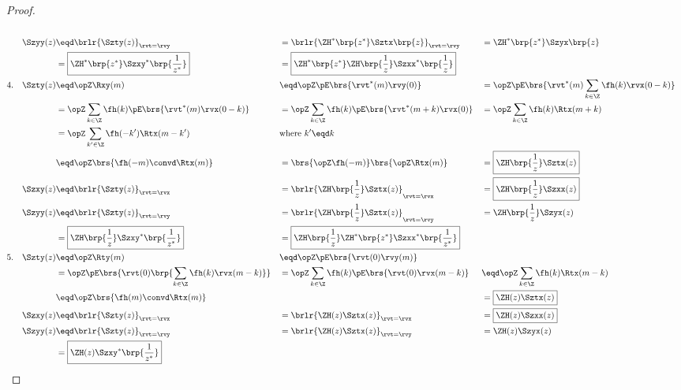 \begin{proof}
{\begin{align*}
    \\
    \Szyy(z)
      &\eqd \brlr{\Szty(z)}_{\rvt=\rvy}
     &&= \brlr{\ZH^\ast\brp{z^\ast} \Sztx\brp{z}}_{\rvt=\rvy}
     &&= \ZH^\ast\brp{z^\ast} \Szyx\brp{z}
    \\&= \boxed{\ZH^\ast\brp{z^\ast} \Szxy^\ast\brp{\frac{1}{z^\ast}}}
     &&= \boxed{\ZH^\ast\brp{z^\ast} \ZH\brp{\frac{1}{z}} \Szxx^\ast\brp{\frac{1}{z}}}
\\
    4.\quad\Szty(z)
      &\eqd \opZ\Rxy(m)
     &&\eqd \opZ\pE\brs{\rvt^\ast(m)\rvy(0)}
     &&=    \opZ\pE\brs{\rvt^\ast(m)\sum_{k\in\Z} \fh(k)           \rvx(0-k)}
    \\&=    \opZ\sum_{k\in\Z} \fh(k)\pE\brs{\rvt^\ast(m)\rvx(0-k)}
     &&=    \opZ\sum_{k\in\Z} \fh(k)\pE\brs{\rvt^\ast(m+k)\rvx(0)}
     &&=    \opZ\sum_{k\in\Z} \fh(k)\Rtx(m+k)
    \\&=    \opZ\sum_{k'\in\Z} \fh(-k')\Rtx(m-k')
      && \text{where $k'\eqd k$}
    \\&\eqd \opZ\brs{\fh(-m) \convd \Rtx(m)}
     &&= \brs{\opZ\fh(-m)} \brs{\opZ\Rtx(m)}
     &&= \boxed{\ZH\brp{\frac{1}{z}} \Sztx(z)}
    \\
    \Szxy(z)
      &\eqd \brlr{\Szty(z)}_{\rvt=\rvx}
     &&= \brlr{\ZH\brp{\frac{1}{z}} \Sztx(z)}_{\rvt=\rvx}
     &&= \boxed{\ZH\brp{\frac{1}{z}} \Szxx(z)}
    \\
    \Szyy(z)
      &\eqd \brlr{\Szty(z)}_{\rvt=\rvy}
     &&= \brlr{\ZH\brp{\frac{1}{z}} \Sztx(z)}_{\rvt=\rvy}
     &&= \ZH\brp{\frac{1}{z}} \Szyx(z)
    \\&= \boxed{\ZH\brp{\frac{1}{z}} \Szxy^\ast\brp{\frac{1}{z^\ast}}}
     &&= \boxed{\ZH\brp{\frac{1}{z}} \ZH^\ast\brp{z^\ast} \Szxx^\ast\brp{\frac{1}{z^\ast}}}
\\
    5.\quad\Szty(z)
      &\eqd \opZ\Rty(m)
     &&\eqd \opZ\pE\brs{\rvt(0)\rvy(m)}
    \\&=    \opZ\pE\brs{\rvt(0)\brp{\sum_{k\in\Z} \fh(k) \rvx(m-k)}}
     &&=    \opZ                    \sum_{k\in\Z} \fh(k) \pE\brs{\rvt(0)\rvx(m-k)}
     &&\eqd \opZ                    \sum_{k\in\Z} \fh(k) \Rtx(m-k)
    \\&\eqd \opZ\brs{\fh(m) \convd \Rtx(m)}
      &&
      &&= \boxed{\ZH(z) \Sztx(z)}
    \\
    \Szxy(z)
      &\eqd \brlr{\Szty(z)}_{\rvt=\rvx}
     &&= \brlr{\ZH(z) \Sztx(z)}_{\rvt=\rvx}
     &&= \boxed{\ZH(z) \Szxx(z)}
    \\
    \Szyy(z)
      &\eqd \brlr{\Szty(z)}_{\rvt=\rvy}
     &&= \brlr{\ZH(z) \Sztx(z)}_{\rvt=\rvy}
     &&= \ZH(z) \Szyx(z)
    \\&= \boxed{\ZH(z) \Szxy^\ast\brp{\frac{1}{z^\ast}}}

\end{align*}}
\end{proof}
